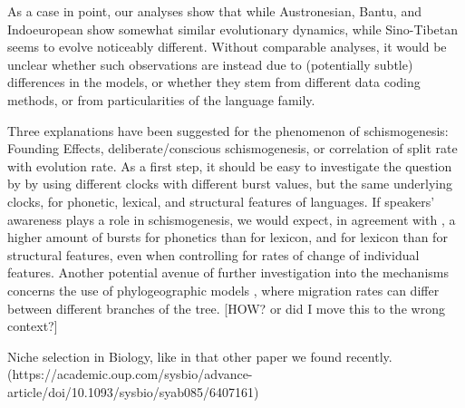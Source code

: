 \documentclass[a4paper,12pt]{scrartcl}
\begin{document}
As a case in point, our analyses show that while Austronesian, Bantu, and
Indoeuropean show somewhat similar evolutionary dynamics, while Sino-Tibetan
seems to evolve noticeably different. Without comparable analyses, it would be
unclear whether such observations are instead due to (potentially subtle)
differences in the models, or whether they stem from different data coding
methods, or from particularities of the language family.



Three explanations have been suggested for the phenomenon of schismogenesis:
Founding Effects, deliberate/conscious schismogenesis, or correlation of split
rate with evolution rate. As a first step, it should be easy to investigate the
question by \textcite{gray2013three} by using different clocks with different
burst values, but the same underlying clocks, for phonetic, lexical, and
structural features of languages. If speakers' awareness plays a role in
schismogenesis, we would expect, in agreement with \citeauthor{gray2013three}, a
higher amount of bursts for phonetics than for lexicon, and for lexicon than for
structural features, even when controlling for rates of change of individual
features. Another potential avenue of further investigation into the mechanisms
concerns the use of phylogeographic models \parencite{neureiter2021can}, where
migration rates can differ between different branches of the tree. [HOW? or did I move this to the wrong context?]

Niche selection in Biology, like in that other paper we found recently.
(https://academic.oup.com/sysbio/advance-article/doi/10.1093/sysbio/syab085/6407161)


\printbibliography{}
\end{document}
